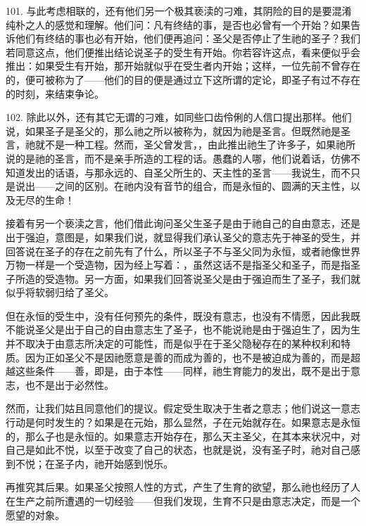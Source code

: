 101. 与此考虑相联的，还有他们另一个极其亵渎的刁难，其阴险的目的是要混淆纯朴之人的感觉和理解。他们问：凡有终结的事，是否也必曾有一个开始？如果告诉他们有终结的事也必有开始，他们便再追问：圣父是否停止了生祂的圣子？我们若同意这点，他们便推出结论说圣子的受生有开始。你若容许这点，看来便似乎会推出：如果受生有开始，那开始就似乎在受生者内开始；这样，一位先前不曾存在的，便可被称为了——他们的目的便是通过立下这所谓的定论，即圣子有过不存在的时刻，来结束争论。\par

102. 除此以外，还有其它无谓的刁难，如同些口齿伶俐的人信口提出那样。他们说，如果圣子是圣父的，那么祂之所以被称为，就因为祂是圣言。但既然祂是圣言，祂就不是一种工程。然而，圣父曾发言，，由此推出祂生了许多子，如果祂所说的是祂的圣言，而不是亲手所造的工程的话。愚蠢的人哪，他们说着话，仿佛不知道发出的话语，与那永远的、自圣父所生的、天主性的圣言——我说生，而不只是说出——之间的区别。在祂内没有音节的组合，而是永恒的、圆满的天主性，以及无尽的生命！\par

接着有另一个亵渎之言，他们借此询问圣父生圣子是由于祂自己的自由意志，还是出于强迫，意图是，如果我们说，就显得我们承认圣父的意志先于神圣的受生，并回答说在圣子的存在之前先有了什么，所以圣子不与圣父同为永恒，或者祂像世界万物一样是一个受造物，因为经上写着：，虽然这话不是指圣父和圣子，而是指圣子所造的受造物。另一方面，如果我们回答说圣父是由于强迫而生了圣子，我们就似乎将软弱归给了圣父。\par

但在永恒的受生中，没有任何预先的条件，既没有意志，也没有不情愿，因此我既不能说圣父是出于自己的自由意志生了圣子，也不能说祂是由于强迫生了，因为生并不取决于由意志所决定的可能性，而是似乎在于圣父隐秘存在的某种权利和特质。因为正如圣父不是因祂愿意是善的而成为善的，也不是被迫成为善的，而是超越这些条件——善，即是，由于本性——同样，祂生育能力的发出，既不是出于意志，也不是出于必然性。\par

然而，让我们姑且同意他们的提议。假定受生取决于生者之意志；他们说这一意志行动是何时发生的？如果是在元始，那么显然，子在元始就存在。如果意志是永恒的，那么子也是永恒的。如果意志开始存在，那么天主圣父，在其本来状况中，对自己是如此不悦，以至于改变了自己的状态，也就是说，没有圣子时，祂对自己感到不悦；在圣子内，祂开始感到悦乐。\par

再推究其后果。如果圣父按照人性的方式，产生了生育的欲望，那么祂也经历了人在生产之前所遭遇的一切经验——但我们发现，生育不只是由意志决定，而是一个愿望的对象。\par

